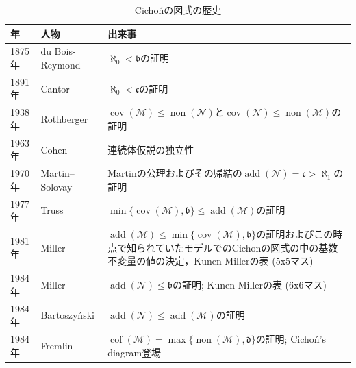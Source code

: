 \documentclass[uplatex,dvipdfmx]{jsarticle}
\newcommand{\non}{\operatorname{non}}
\newcommand{\cov}{\operatorname{cov}}
\newcommand{\add}{\operatorname{add}}
\newcommand{\cof}{\operatorname{cof}}
\newcommand{\nul}{\mathcal{N}}
\newcommand{\meager}{\mathcal{M}}
\newcommand{\frakc}{\mathfrak{c}}
\newcommand{\frakb}{\mathfrak{b}}
\newcommand{\frakd}{\mathfrak{d}}
\theoremstyle{definition}
\begin{document}
	\begin{table}[p]\label{table:history}
		\caption{Cichońの図式の歴史}
			\begin{tabular}{@{} l|l|p{8cm}}
			年     & 人物                                & 出来事                                                                                                                                                       \\ \hline
			1875年 & du Bois-Reymond & $\aleph_0 < \frakb$の証明 \\ \hline
			1891年 & Cantor & $\aleph_0 < \frakc$の証明 \\ \hline
			1938年 & Rothberger                        & $\cov(\meager) \le \non(\nul)$と$\cov(\nul)\le\non(\meager)$の証明                                                                                            \\ \hline
			1963年 & Cohen                             & 連続体仮説の独立性                                                                                                                                                 \\ \hline
			1970年 & Martin--Solovay                   & Martinの公理およびその帰結の$\add(\nul)=\frakc>\aleph_1$の証明                                                                                                           \\ \hline
			1977年 & Truss                             & $\min\{\cov(\meager), \frakb\} \le \add(\meager)$の証明                                                                                                       \\ \hline
			1981年 & Miller                            & $\add(\meager) \le \min\{\cov(\meager), \frakb\}$の証明およびこの時点で知られていたモデルでのCichonの図式の中の基数不変量の値の決定，Kunen-Millerの表 (5x5マス) \\ \hline
			1984年 & Miller                            & $\add(\nul) \le \frakb$の証明; Kunen-Millerの表 (6x6マス)                                                                                                        \\ \hline
			1984年 & Bartoszyński                      & $\add(\nul) \le \add(\meager)$の証明                                                                                                                         \\ \hline
			1984年 & Fremlin                      & $\cof(\meager) = \max\{\non(\meager), \frakd\}$の証明; Cichoń's diagram登場                                                                                                                     \\ \hline

\end{tabular}
\end{table}
\end{document}
